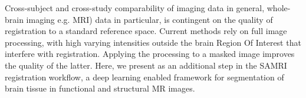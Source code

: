 Cross-subject and cross-study comparability of imaging data in general, whole-brain imaging e.g. MRI) data in particular, is contingent on the quality of registration to a standard reference space.
Current methods rely on full image processing, with high varying intensities outside the brain Region Of Interest that interfere with registration.
Applying the processing to a masked image improves the quality of the latter.
Here, we present as an additional step in the SAMRI registration workflow, a deep learning enabled framework for segmentation of brain tissue in functional and structural MR images.



